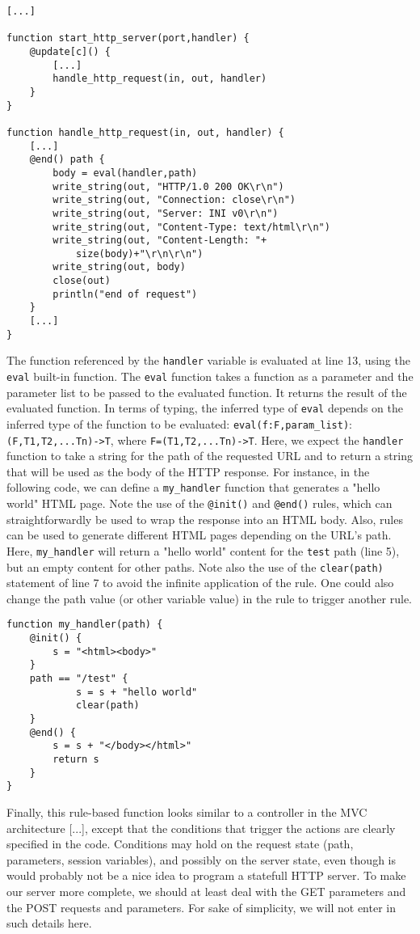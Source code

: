 \documentclass[11pt]{article}
\begin{document}
\begin{lstlisting}
[...]

function start_http_server(port,handler) {
	@update[c]() {
		[...]
		handle_http_request(in, out, handler)
	}		
}

function handle_http_request(in, out, handler) {
	[...]
	@end() path {
		body = eval(handler,path)
		write_string(out, "HTTP/1.0 200 OK\r\n")
		write_string(out, "Connection: close\r\n")
		write_string(out, "Server: INI v0\r\n")
		write_string(out, "Content-Type: text/html\r\n")
		write_string(out, "Content-Length: "+
			size(body)+"\r\n\r\n")
		write_string(out, body)
		close(out)
		println("end of request")		
	}
	[...]
}
\end{lstlisting}

The function referenced by the \texttt{handler} variable is evaluated at line 13, using the \texttt{eval} built-in function. The \texttt{eval} function takes a function as a parameter and the parameter list to be passed to the evaluated function. It returns the result of the evaluated function. In terms of typing, the inferred type of \texttt{eval} depends on the inferred type of the function to be evaluated: \texttt{eval(f:F,param\_list)}:\texttt{(F,T1,T2,...Tn)->T}, where \texttt{F=(T1,T2,...Tn)->T}. Here, we expect the \texttt{handler} function to take a string for the path of the requested URL and to return a string that will be used as the body of the HTTP response. For instance, in the following code, we can define a \texttt{my\_handler} function that generates a "hello world" HTML page. Note the use of the \texttt{@init()} and \texttt{@end()} rules, which can straightforwardly be used to wrap the response into an HTML body. Also, rules can be used to generate different HTML pages depending on the URL's path. Here, \texttt{my\_handler} will return a "hello world" content for the \texttt{test} path (line 5), but an empty content for other paths. Note also the use of the \texttt{clear(path)} statement of line 7 to avoid the infinite application of the rule. One could also change the path value (or other variable value) in the rule to trigger another rule.

\begin{lstlisting}
function my_handler(path) {
	@init() {
		s = "<html><body>"
	}
	path == "/test" {
			s = s + "hello world"
			clear(path)
	}
	@end() {
		s = s + "</body></html>"
		return s
	}
}
\end{lstlisting}

Finally, this rule-based function looks similar to a controller in the MVC architecture [...], except that the conditions that trigger the actions are clearly specified in the code. Conditions may hold on the request state (path, parameters, session variables), and possibly on the server state, even though is would probably not be a nice idea to program a statefull HTTP server. To make our server more complete, we should at least deal with the GET parameters and the POST requests and parameters. For sake of simplicity, we will not enter in such details here.
\end{document}
